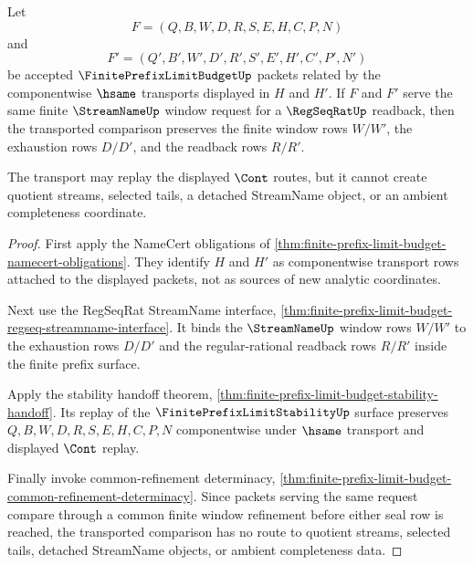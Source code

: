 \begin{theorem}
\label{thm:finite-prefix-limit-budget-prefix-window-stability}
Let
$$
F=(Q,B,W,D,R,S,E,H,C,P,N)
$$
and
$$
F'=(Q',B',W',D',R',S',E',H',C',P',N')
$$
be accepted $\FinitePrefixLimitBudgetUp$ packets related by the componentwise $\hsame$ transports displayed in $H$ and $H'$. If $F$ and $F'$ serve the same finite $\StreamNameUp$ window request for a $\RegSeqRatUp$ readback, then the transported comparison preserves the finite window rows $W/W'$, the exhaustion rows $D/D'$, and the readback rows $R/R'$.

The transport may replay the displayed $\Cont$ routes, but it cannot create quotient streams, selected tails, a detached StreamName object, or an ambient completeness coordinate.
\end{theorem}
\begin{proof}
First apply the NameCert obligations of \autoref{thm:finite-prefix-limit-budget-namecert-obligations}. They identify $H$ and $H'$ as componentwise transport rows attached to the displayed packets, not as sources of new analytic coordinates.

Next use the RegSeqRat StreamName interface, \autoref{thm:finite-prefix-limit-budget-regseq-streamname-interface}. It binds the $\StreamNameUp$ window rows $W/W'$ to the exhaustion rows $D/D'$ and the regular-rational readback rows $R/R'$ inside the finite prefix surface.

Apply the stability handoff theorem, \autoref{thm:finite-prefix-limit-budget-stability-handoff}. Its replay of the $\FinitePrefixLimitStabilityUp$ surface preserves $Q,B,W,D,R,S,E,H,C,P,N$ componentwise under $\hsame$ transport and displayed $\Cont$ replay.

Finally invoke common-refinement determinacy, \autoref{thm:finite-prefix-limit-budget-common-refinement-determinacy}. Since packets serving the same request compare through a common finite window refinement before either seal row is reached, the transported comparison has no route to quotient streams, selected tails, detached StreamName objects, or ambient completeness data.
\end{proof}

